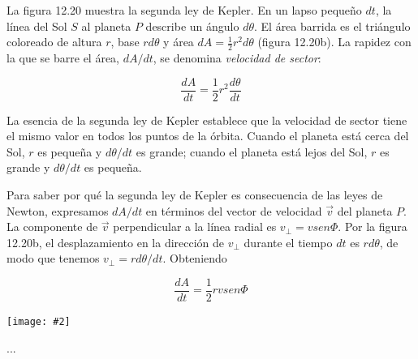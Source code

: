 \documentclass{article}
\newcommand{\ladoALado}[4]{
    \begin{minipage}[t]{#3\textwidth}
        \vspace{0pt}
        #1
    \end{minipage}
    \hfill
    \begin{minipage}[t]{#4\textwidth}
        \vspace{0pt}
        \centering
        \texttt{[image: \#2]}
    \end{minipage}
}
\begin{document}
    \ladoALado{
        \par La ﬁgura 12.20 muestra la segunda ley de Kepler. En un lapso pequeño $dt$, la línea del Sol $S$ al planeta $P$ describe un ángulo $d \theta$. El área barrida es el triángulo coloreado de altura $r$, base $r d \theta$ y área $dA = \frac{1}{2} r^2 d \theta$ (ﬁgura 12.20b). La rapidez con la que se barre el área, $dA/dt$, se denomina \textit{velocidad de sector}:

        \[ \frac{dA}{dt} = \frac{1}{2} r^2 \frac{d \theta}{dt} \]

        \par La esencia de la segunda ley de Kepler establece que la velocidad de sector tiene el mismo valor en todos los puntos de la órbita. Cuando el planeta está cerca del Sol, $r$ es pequeña y $d\theta/dt$ es grande; cuando el planeta está lejos del Sol, $r$ es grande y $d\theta/dt$ es pequeña.

        \vspace{0.4cm}

        \par Para saber por qué la segunda ley de Kepler es consecuencia de las leyes de Newton, expresamos $dA/dt$ en términos del vector de velocidad $\vec{v}$ del planeta $P$. La componente de $\vec{v}$ perpendicular a la línea radial es $v_{\perp} = v sen \Phi$. Por la ﬁgura 12.20b, el desplazamiento en la dirección de $v_{\perp}$ durante el tiempo $dt$ es $r d \theta$, de modo que tenemos $v_{\perp} = r d\theta/dt$. Obteniendo

        \[ \frac{dA}{dt} = \frac{1}{2} r v sen \Phi\]
        

    }{img/11.5-2.png}{0.6}{0.4}
    
        \par ... %
\end{document}
